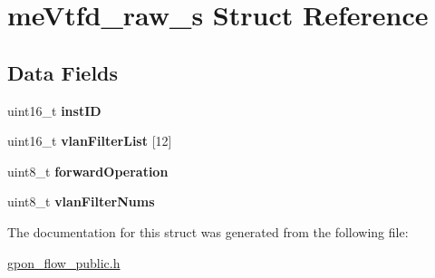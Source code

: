 \hypertarget{structmeVtfd__raw__s}{}\section{me\+Vtfd\+\_\+raw\+\_\+s Struct Reference}
\label{structmeVtfd__raw__s}
\subsection*{Data Fields}
\begin{DoxyCompactItemize}
\item 
\mbox{\label{structmeVtfd__raw__s_a6f6e1e2220c82f50a8a9f6740a17afa7}} 
uint16\+\_\+t {\bfseries inst\+ID}
\item 
\mbox{\label{structmeVtfd__raw__s_a951546431b33053414c6a71dc599c464}} 
uint16\+\_\+t {\bfseries vlan\+Filter\+List} \mbox{[}12\mbox{]}
\item 
\mbox{\label{structmeVtfd__raw__s_a1b5c6124a3c013ed155452e57aa99c5b}} 
uint8\+\_\+t {\bfseries forward\+Operation}
\item 
\mbox{\label{structmeVtfd__raw__s_aa87be050f14bcd3895db9a5466585062}} 
uint8\+\_\+t {\bfseries vlan\+Filter\+Nums}
\end{DoxyCompactItemize}


The documentation for this struct was generated from the following file\+:\begin{DoxyCompactItemize}
\item 
\hyperlink{gpon__flow__public_8h}{gpon\+\_\+flow\+\_\+public.\+h}\end{DoxyCompactItemize}
